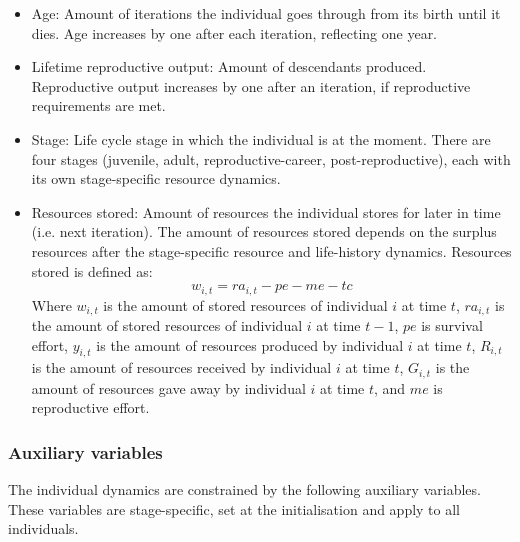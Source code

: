\documentclass{article}
\begin{document}
    \begin{itemize}
        \item Age: Amount of iterations the individual goes through from its birth until it dies. Age increases by one after each iteration, reflecting one year.
        \item Lifetime reproductive output: Amount of descendants produced. Reproductive output increases by one after an iteration, if reproductive requirements are met.
        \item Stage: Life cycle stage in which the individual is at the moment. There are four stages (juvenile, adult, reproductive-career, post-reproductive), each with its own stage-specific resource dynamics. 
        \item Resources stored: Amount of resources the individual stores for later in time (i.e. next iteration). The amount of resources stored depends on the surplus resources after the stage-specific resource and life-history dynamics. Resources stored is defined as:
\begin{equation}
    w_{i,t}=ra_{i,t} - pe - me - tc
\end{equation}
    Where $w_{i,t}$ is the amount of stored resources of individual $i$ at time $t$, $ra_{i,t}$ is the amount of stored resources of individual $i$ at time $t-1$, $pe$ is survival effort, $y_{i,t}$ is the amount of resources produced by individual $i$ at time $t$, $R_{i,t}$ is the amount of resources received by individual $i$ at time $t$, $G_{i,t}$ is the amount of resources gave away by individual $i$ at time $t$, and $me$ is reproductive effort.
    \end{itemize}

\subsubsection{Auxiliary variables}

The individual dynamics are constrained by the following auxiliary variables. These variables are stage-specific, set at the initialisation and apply to all individuals.
\end{document}
